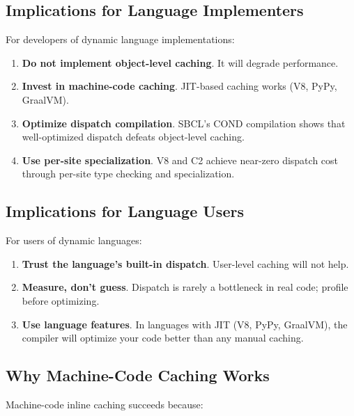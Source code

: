 \documentclass[sigplan,final]{acmart}
\begin{document}
\subsection{Implications for Language Implementers}

For developers of dynamic language implementations:

\begin{enumerate}
  \item \textbf{Do not implement object-level caching}. It will degrade performance.

  \item \textbf{Invest in machine-code caching}. JIT-based caching works (V8, PyPy, GraalVM).

  \item \textbf{Optimize dispatch compilation}. SBCL's COND compilation shows that well-optimized
    dispatch defeats object-level caching.

  \item \textbf{Use per-site specialization}. V8 and C2 achieve near-zero dispatch cost through
    per-site type checking and specialization.
\end{enumerate}

\subsection{Implications for Language Users}

For users of dynamic languages:

\begin{enumerate}
  \item \textbf{Trust the language's built-in dispatch}. User-level caching will not help.

  \item \textbf{Measure, don't guess}. Dispatch is rarely a bottleneck in real code; profile before
    optimizing.

  \item \textbf{Use language features}. In languages with JIT (V8, PyPy, GraalVM), the compiler
    will optimize your code better than any manual caching.
\end{enumerate}

\subsection{Why Machine-Code Caching Works}

Machine-code inline caching succeeds because:
\end{document}

